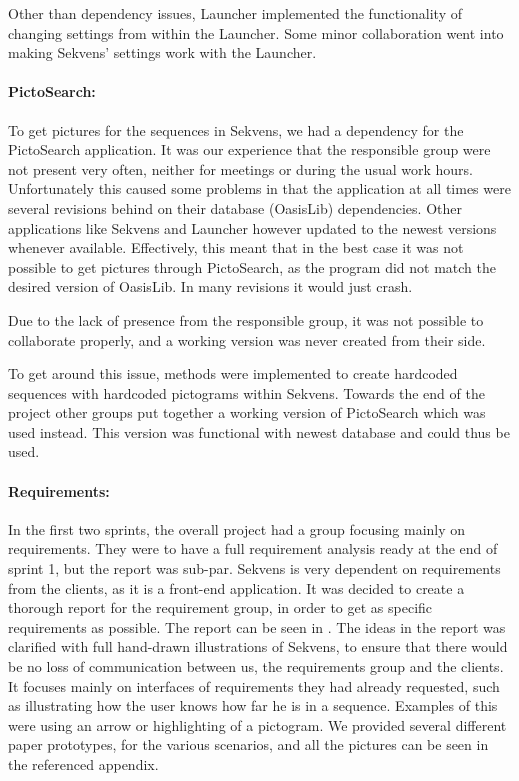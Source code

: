 Other than dependency issues, Launcher implemented the functionality of changing settings from within the Launcher. Some minor collaboration went into making Sekvens' settings work with the Launcher.

\paragraph{PictoSearch:}
To get pictures for the sequences in Sekvens, we had a dependency for the PictoSearch application. It was our experience that the responsible group were not present very often, neither for meetings or during the usual work hours. Unfortunately this caused some problems in that the application at all times were several revisions behind on their database (OasisLib) dependencies. Other applications like Sekvens and Launcher however updated to the newest versions whenever available. Effectively, this meant that in the best case it was not possible to get pictures through PictoSearch, as the program did not match the desired version of OasisLib. In many revisions it would just crash.

Due to the lack of presence from the responsible group, it was not possible to collaborate properly, and a working version was never created from their side.

To get around this issue, methods were implemented to create hardcoded sequences with hardcoded pictograms within Sekvens. Towards the end of the project other groups put together a working version of PictoSearch which was used instead. This version was functional with newest database and could thus be used.

\paragraph{Requirements:}
In the first two sprints, the overall project had a group focusing mainly on requirements. They were to have a full requirement analysis ready at the end of sprint 1, but the report was sub-par. Sekvens is very dependent on requirements from the clients, as it is a front-end application. It was decided to create a thorough report for the requirement group, in order to get as specific requirements as possible. The report can be seen in . The ideas in the report was clarified with full hand-drawn illustrations of Sekvens, to ensure that there would be no loss of communication between us, the requirements group and the clients. It focuses mainly on interfaces of requirements they had already requested, such as illustrating how the user knows how far he is in a sequence. Examples of this were using an arrow or highlighting of a pictogram. We provided several different paper prototypes, for the various scenarios, and all the pictures can be seen in the referenced appendix.